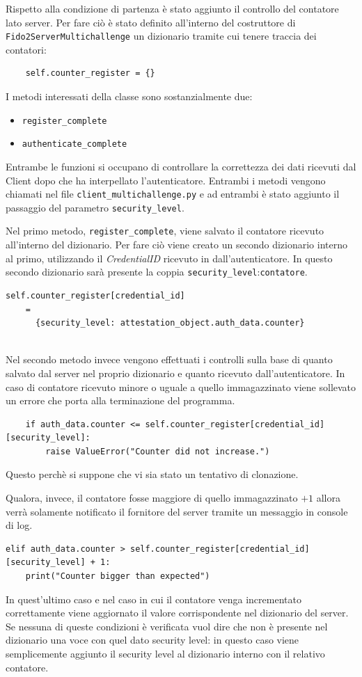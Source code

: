 Rispetto alla condizione di partenza è stato aggiunto il controllo del contatore lato server. Per fare ciò è stato definito all'interno del costruttore di \verb*|Fido2ServerMultichallenge| un dizionario tramite cui tenere traccia dei contatori:
\begin{verbatim}
	self.counter_register = {}
\end{verbatim}
I metodi interessati della classe sono sostanzialmente due: 
\begin{itemize}
	\item \verb*|register_complete|
	\item \verb*|authenticate_complete|
\end{itemize}

Entrambe le funzioni si occupano di controllare la correttezza dei dati ricevuti dal Client dopo che ha interpellato l'autenticatore. Entrambi i metodi vengono chiamati nel file \verb*|client_multichallenge.py| e ad entrambi è stato aggiunto il passaggio del parametro \verb*|security_level|.

Nel primo metodo, \verb*|register_complete|, viene salvato il contatore ricevuto all'interno del dizionario. Per fare ciò viene creato un secondo dizionario interno al primo, utilizzando il \emph{CredentialID} ricevuto in dall'autenticatore. In questo secondo dizionario sarà presente la coppia \verb*|security_level|:\verb*|contatore|. 
\begin{verbatim}
self.counter_register[credential_id] 
    = 
      {security_level: attestation_object.auth_data.counter}
	
\end{verbatim}

Nel secondo metodo invece vengono effettuati i controlli sulla base di quanto salvato dal server nel proprio dizionario e quanto ricevuto dall'autenticatore. In caso di contatore ricevuto minore o uguale a quello immagazzinato viene sollevato un errore che porta alla terminazione del programma. 
\begin{verbatim}
	if auth_data.counter <= self.counter_register[credential_id][security_level]:
	    raise ValueError("Counter did not increase.")
\end{verbatim}
Questo perchè si suppone che vi sia stato un tentativo di clonazione. 

Qualora, invece, il contatore fosse maggiore di quello immagazzinato $+1$ allora verrà solamente notificato il fornitore del server tramite un messaggio in console di log. 
\begin{verbatim}
elif auth_data.counter > self.counter_register[credential_id][security_level] + 1:
    print("Counter bigger than expected")
\end{verbatim}
In quest'ultimo caso e nel caso in cui il contatore venga incrementato correttamente viene aggiornato il valore corrispondente nel dizionario del server. Se nessuna di queste condizioni è verificata vuol dire che non è presente nel dizionario una voce con quel dato security level: in questo caso viene semplicemente aggiunto il security level al dizionario interno con il relativo contatore.

